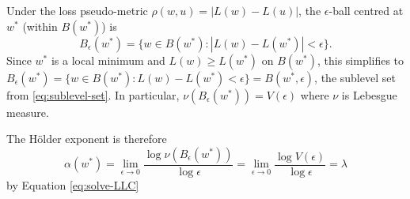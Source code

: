 \documentclass[11pt]{article}
\begin{document}
\begin{solution}
    Under the loss pseudo-metric $\rho(w,u) = |L(w) - L(u)|$, the
    $\epsilon$-ball centred at $w^*$ (within $B(w^*)$) is
    \begin{equation*}
        B_\epsilon(w^*)
        = \{w \in B(w^*) : |L(w) - L(w^*)| < \epsilon\}.
    \end{equation*}
    Since $w^*$ is a local minimum and $L(w) \geq L(w^*)$ on $B(w^*)$,
    this simplifies to
    $B_\epsilon(w^*) = \{w \in B(w^*) : L(w) - L(w^*) < \epsilon\}
    = B(w^*,\epsilon)$, the sublevel set from \eqref{eq:sublevel-set}. In
    particular, $\nu(B_\epsilon(w^*)) = V(\epsilon)$ where $\nu$ is
    Lebesgue measure.

    The H\"older exponent is therefore
    \begin{equation*}
        \alpha(w^*)
        = \lim_{\epsilon\to 0}
            \frac{\log \nu(B_\epsilon(w^*))}{\log\epsilon}
        = \lim_{\epsilon\to 0}
            \frac{\log V(\epsilon)}{\log\epsilon} = \lambda
    \end{equation*}
    by Equation \eqref{eq:solve-LLC}
    
\end{solution}
\end{document}
